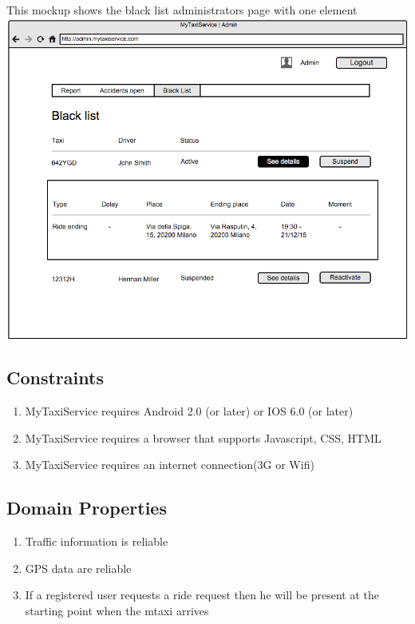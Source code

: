 \documentclass[11pt,titlepage]{article} %
\begin{document}
        \newline
        This mockup shows the black list administrators page with one element\newline
        \newline
        \includegraphics[scale=0.52]{blacklist.png}\newline
        \newline
        \newpage

    \subsection{Constraints}
	\begin{enumerate}
	      \item MyTaxiService requires Android 2.0 (or later) or IOS 6.0 (or later)
	      \item MyTaxiService requires a browser that supports Javascript, CSS, HTML
	      \item MyTaxiService requires an internet connection(3G or Wifi)
	\end{enumerate}

    \subsection{Domain Properties}
	\begin{enumerate}
	      \item Traffic information is  reliable
	      \item GPS data are reliable
	      \item If a registered user requests a ride request then he will be present at the starting point when the mtaxi arrives
	\end{enumerate}
\end{document}

